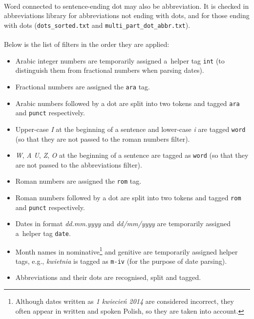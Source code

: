 \documentclass[oneside,12pt]{article}
\begin{document}
\paragraph{}
Word connected to sentence-ending dot may also be abbreviation. It is checked in abbreviations library for abbreviations not ending with dots, and for those ending with dots (\texttt{dots\_sorted.txt} and \texttt{multi\_part\_dot\_abbr.txt}).

\paragraph{}
Below is the list of filters in the order they are applied:
    \begin{itemize}
        \item Arabic integer numbers are temporarily assigned a~helper tag \texttt{int} (to distinguish them from fractional numbers when parsing dates).
        \item Fractional numbers are assigned the \texttt{ara} tag.
        \item Arabic numbers followed by a dot are split into two tokens and tagged \texttt{ara} and \texttt{punct} respectively.
        \item Upper-case \textit{I} at the beginning of a sentence and lower-case \textit{i} are tagged \texttt{word} (so that they are not passed to the roman numbers filter).
        \item \textit{W}, \textit{A} \textit{U}, \textit{Z}, \textit{O} at the beginning of a sentence are tagged as \texttt{word} (so that they are not passed to the abbreviations filter).
        \item Roman numbers are assigned the \texttt{rom} tag.
        \item Roman numbers followed by a dot are split into two tokens and tagged \texttt{rom} and \texttt{punct} respectively.
        \item Dates in format \textit{dd.mm.yyyy} and \textit{dd/mm/yyyy} are temporarily assigned a~helper tag \texttt{date}.
        \item Month names in nominative\footnote{Although dates written as \textit{1 kwiecień 2014} are considered incorrect, they often appear in written and spoken Polish, so they are taken into account.} and genitive are temporarily assigned helper tags, e.g., \textit{kwietnia} is tagged as \texttt{m-iv} (for the purpose of date parsing).
        \item Abbreviations and their dots are recognised, split and tagged.

\end{itemize}
\end{document}
